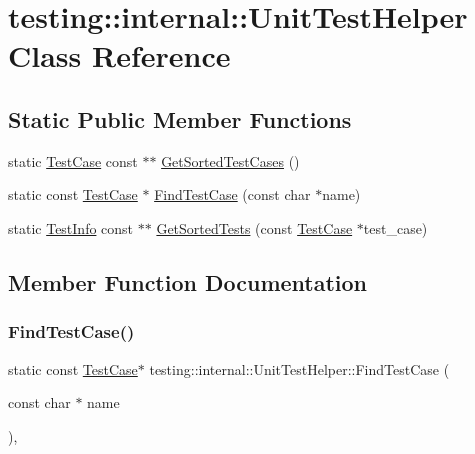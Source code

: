 \hypertarget{classtesting_1_1internal_1_1UnitTestHelper}{}\section{testing\+::internal\+::Unit\+Test\+Helper Class Reference}
\label{classtesting_1_1internal_1_1UnitTestHelper}
\subsection*{Static Public Member Functions}
\begin{DoxyCompactItemize}
\item 
static \mbox{\hyperlink{classtesting_1_1TestCase}{Test\+Case}} const  $\ast$$\ast$ \mbox{\hyperlink{classtesting_1_1internal_1_1UnitTestHelper_a9a549307062083d10358638af272cc98}{Get\+Sorted\+Test\+Cases}} ()
\item 
static const \mbox{\hyperlink{classtesting_1_1TestCase}{Test\+Case}} $\ast$ \mbox{\hyperlink{classtesting_1_1internal_1_1UnitTestHelper_a46303cbb7a6abb456f7b1350542113ac}{Find\+Test\+Case}} (const char $\ast$name)
\item 
static \mbox{\hyperlink{classtesting_1_1TestInfo}{Test\+Info}} const  $\ast$$\ast$ \mbox{\hyperlink{classtesting_1_1internal_1_1UnitTestHelper_a02602d22fb74566dad78c0c9d4f24e78}{Get\+Sorted\+Tests}} (const \mbox{\hyperlink{classtesting_1_1TestCase}{Test\+Case}} $\ast$test\+\_\+case)
\end{DoxyCompactItemize}


\subsection{Member Function Documentation}
\mbox{\label{classtesting_1_1internal_1_1UnitTestHelper_a46303cbb7a6abb456f7b1350542113ac}} 
\subsubsection{\texorpdfstring{FindTestCase()}{FindTestCase()}}
{\footnotesize\ttfamily static const \mbox{\hyperlink{classtesting_1_1TestCase}{Test\+Case}}$\ast$ testing\+::internal\+::\+Unit\+Test\+Helper\+::\+Find\+Test\+Case (\begin{DoxyParamCaption}\item[{const char $\ast$}]{name }\end{DoxyParamCaption})\hspace{0.3cm}{\ttfamily [inline]}, {\ttfamily [static]}}

